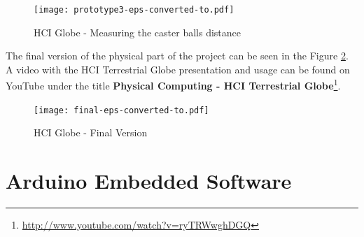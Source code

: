 \documentclass[12pt]{article}
\begin{document}
\begin{figure}[ht]\centering
\texttt{[image: prototype3-eps-converted-to.pdf]} 
\caption{HCI Globe - Measuring the caster balls distance}\centering 
\label{fig:prot3}
\end{figure}	

The final version of the physical part of the project can be seen in the Figure \ref{fig:final}. A video with the HCI Terrestrial Globe presentation and usage can be found on YouTube under the title \textbf{Physical Computing - HCI Terrestrial Globe}\footnote{\url{http://www.youtube.com/watch?v=ryTRWwghDGQ}}.

\begin{figure}[ht]\centering
\texttt{[image: final-eps-converted-to.pdf]} 
\caption{HCI Globe - Final Version}\centering 
\label{fig:final}
\end{figure}	


\section{Arduino Embedded Software}
\end{document}
